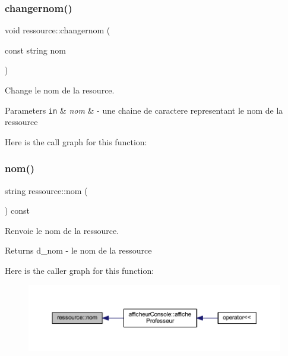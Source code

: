 \subsubsection{\texorpdfstring{changernom()}{changernom()}}
{\footnotesize\ttfamily void ressource\+::changernom (\begin{DoxyParamCaption}\item[{const string}]{nom }\end{DoxyParamCaption})}



Change le nom de la resource. 


\begin{DoxyParams}[1]{Parameters}
\mbox{\tt in}  & {\em nom} & -\/ une chaine de caractere representant le nom de la ressource \\
\hline
\end{DoxyParams}
Here is the call graph for this function\+:
\hypertarget{classressource_aff712b6d732b3f4091dd29f4349aba85}{}\label{classressource_aff712b6d732b3f4091dd29f4349aba85} 
\subsubsection{\texorpdfstring{nom()}{nom()}}
{\footnotesize\ttfamily string ressource\+::nom (\begin{DoxyParamCaption}{ }\end{DoxyParamCaption}) const}



Renvoie le nom de la ressource. 

\begin{DoxyReturn}{Returns}
d\+\_\+nom -\/ le nom de la ressource 
\end{DoxyReturn}
Here is the caller graph for this function\+:\nopagebreak
\begin{figure}[H]
\begin{center}
\leavevmode
\includegraphics[width=350pt]{classressource_aff712b6d732b3f4091dd29f4349aba85_icgraph}
\end{center}
\end{figure}
\hypertarget{classressource_aed676709f755431a3cb2a5972bdbf0c0}{}\label{classressource_aed676709f755431a3cb2a5972bdbf0c0} 
